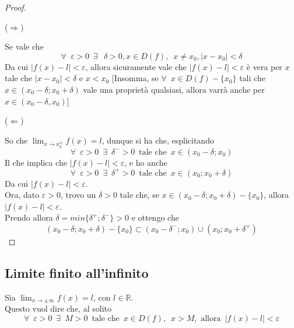 \documentclass{article}
\theoremstyle{definition}
\begin{document}
\begin{proof}
\begin{center}
    ($\Longrightarrow$)
\end{center}
    Se vale che
    \begin{equation}
        \forall \,\,\, \varepsilon>0 \,\,\, \exists \,\,\,\ \delta>0, x \in D(f), \,\,\, x \neq x_0, |x-x_0|<\delta 
    \end{equation}
    Da cui $|f(x)-l|<\varepsilon$, allora sicuramente vale che $|f(x)-l|<\varepsilon$ è vera per $x$ tale che $|x-x_0|<\delta$ e $x<x_0$
    [Insomma, se $\forall \,\,\, x \in D(f)-\{x_0\}$ tali che $x \in (x_0-\delta;x_0+\delta)$ vale una proprietà qualsiasi, allora varrà anche per $x \in (x_0-\delta,x_0)$]
    \begin{center}
    ($\Longleftarrow$)
\end{center}
So che $\lim_{x \to x_0^{\pm}}f(x)=l$, dunque si ha che, esplicitando
\begin{equation}
    \forall \,\,\, \varepsilon>0 \,\,\, \exists \,\,\, \delta^- >0 \,\,\, \mbox{tale che} \,\,\, x \in (x_0-\delta;x_0)
\end{equation}
Il che implica che $|f(x)-l|<\varepsilon$, e ho anche
\begin{equation}
    \forall \,\,\, \varepsilon>0 \,\,\, \exists \,\,\, \delta^+ >0 \,\,\, \mbox{tale che} \,\,\, x \in (x_0;x_0+\delta)
\end{equation}
Da cui $|f(x)-l|<\varepsilon$.
\\
Ora, dato $\varepsilon>0$, trovo un $\delta>0$ tale che, se $x \in (x_0-\delta;x_0+\delta)-\{x_0\}$, allora $|f(x)-l|<\varepsilon$.
\\
Prendo allora $\delta=min\{\delta^+;\delta^-\}>0$ e ottengo che
\begin{equation}
    (x_0-\delta;x_0+\delta)-\{x_0\} \subset (x_0-\delta^-;x_0) \cup (x_0;x_0+\delta^+)
\end{equation}
\end{proof}
\subsection{Limite finito all'infinito}
Sia $\lim_{x \to \pm\infty}f(x)=l$, con $l \in \mathbb{R}$.
\\
Questo vuol dire che, al solito
\begin{equation}
    \forall \,\,\, \varepsilon>0 \,\,\, \exists \,\,\, M>0 \,\,\, \mbox{tale che}\,\,\, x \in D(f), \,\,\, x>M, \,\, \mbox{allora} \,\,\, |f(x)-l|<\varepsilon
\end{equation}
\end{document}
